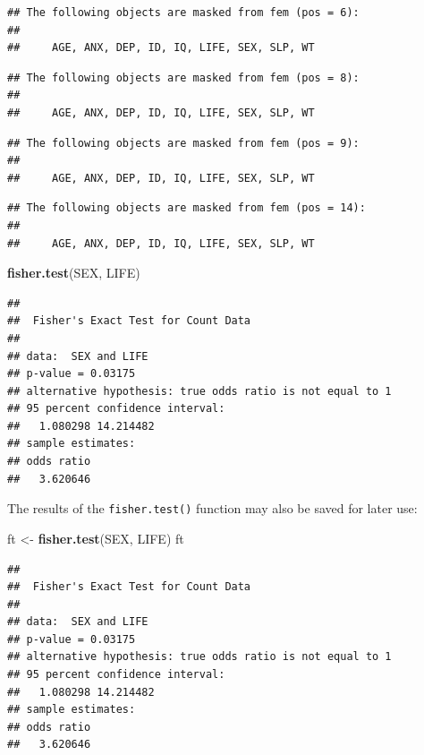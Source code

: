 \documentclass[12pt,]{book}
\newenvironment{Shaded}{\begin{snugshade}}{\end{snugshade}}
\newcommand{\KeywordTok}[1]{\textcolor[rgb]{0.13,0.29,0.53}{\textbf{#1}}}
\newcommand{\StringTok}[1]{\textcolor[rgb]{0.31,0.60,0.02}{#1}}
\newcommand{\NormalTok}[1]{#1}
\theoremstyle{definition}
\theoremstyle{definition}
\theoremstyle{definition}
\theoremstyle{remark}
\begin{document}
\begin{verbatim}
## The following objects are masked from fem (pos = 6):
## 
##     AGE, ANX, DEP, ID, IQ, LIFE, SEX, SLP, WT
\end{verbatim}

\begin{verbatim}
## The following objects are masked from fem (pos = 8):
## 
##     AGE, ANX, DEP, ID, IQ, LIFE, SEX, SLP, WT
\end{verbatim}

\begin{verbatim}
## The following objects are masked from fem (pos = 9):
## 
##     AGE, ANX, DEP, ID, IQ, LIFE, SEX, SLP, WT
\end{verbatim}

\begin{verbatim}
## The following objects are masked from fem (pos = 14):
## 
##     AGE, ANX, DEP, ID, IQ, LIFE, SEX, SLP, WT
\end{verbatim}

\begin{Shaded}
\begin{Highlighting}[]
\KeywordTok{fisher.test}\NormalTok{(SEX, LIFE)}
\end{Highlighting}
\end{Shaded}

\begin{verbatim}
## 
##  Fisher's Exact Test for Count Data
## 
## data:  SEX and LIFE
## p-value = 0.03175
## alternative hypothesis: true odds ratio is not equal to 1
## 95 percent confidence interval:
##   1.080298 14.214482
## sample estimates:
## odds ratio 
##   3.620646
\end{verbatim}

The results of the \texttt{fisher.test()} function may also be saved for
later use:

\begin{Shaded}
\begin{Highlighting}[]
\NormalTok{ft <-}\StringTok{ }\KeywordTok{fisher.test}\NormalTok{(SEX, LIFE)}
\NormalTok{ft}
\end{Highlighting}
\end{Shaded}

\begin{verbatim}
## 
##  Fisher's Exact Test for Count Data
## 
## data:  SEX and LIFE
## p-value = 0.03175
## alternative hypothesis: true odds ratio is not equal to 1
## 95 percent confidence interval:
##   1.080298 14.214482
## sample estimates:
## odds ratio 
##   3.620646
\end{verbatim}
\end{document}
